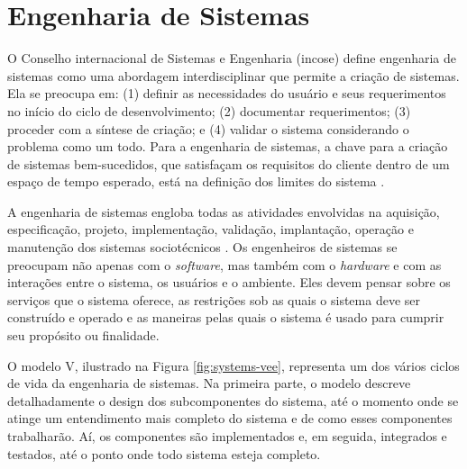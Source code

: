             
  \section{Engenharia de Sistemas}
        
    O Conselho internacional de Sistemas e Engenharia (\acrshort{incose}) define engenharia de sistemas como uma abordagem interdisciplinar que permite a criação de sistemas. Ela se preocupa em: (1) definir as necessidades do usuário e seus requerimentos no início do ciclo de desenvolvimento; (2) documentar requerimentos; (3) proceder com a síntese de criação; e (4) validar o sistema considerando o problema como um todo. Para a engenharia de sistemas, a chave para a criação de sistemas bem-sucedidos, que satisfaçam os requisitos do cliente dentro de um espaço de tempo esperado, está na definição dos limites do sistema \cite{barry2009agent}.
    
    
    A engenharia de sistemas engloba todas as atividades envolvidas na aquisição, especificação, projeto, implementação, validação, implantação, operação e manutenção dos sistemas sociotécnicos \cite{sommerville2003engenharia}. Os engenheiros de sistemas se preocupam não apenas com o \textit{software}, mas também com o \textit{hardware} e com as interações entre o sistema, os usuários e o ambiente. Eles devem pensar sobre os serviços que o sistema oferece, as restrições sob as quais o sistema deve ser construído e operado e as maneiras pelas quais o sistema é usado para cumprir seu propósito ou finalidade.
    
    O modelo V, ilustrado na Figura \ref{fig:systems-vee}, representa um dos vários ciclos de vida da engenharia de sistemas. Na primeira parte, o modelo descreve detalhadamente o design dos subcomponentes do sistema, até o momento onde se atinge um entendimento mais completo do sistema e de como esses componentes trabalharão. Aí, os componentes são implementados e, em seguida, integrados e testados, até o ponto onde todo sistema esteja completo.
    
    \clearpage
    \begin{figure}[h!]
        \centering
    \end{figure}
    
